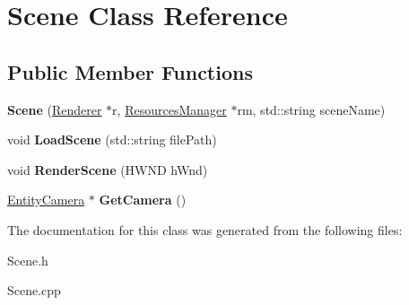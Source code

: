 \hypertarget{class_scene}{\section{Scene Class Reference}
\label{class_scene}
}
\subsection*{Public Member Functions}
\begin{DoxyCompactItemize}
\item 
\hypertarget{class_scene_a5697fbceb61496683804758312cca023}{{\bfseries Scene} (\hyperlink{class_renderer}{Renderer} $\ast$r, \hyperlink{class_resources_manager}{Resources\-Manager} $\ast$rm, std\-::string scene\-Name)}\label{class_scene_a5697fbceb61496683804758312cca023}

\item 
\hypertarget{class_scene_a575e7cc7d0333362979cdd0be76db889}{void {\bfseries Load\-Scene} (std\-::string file\-Path)}\label{class_scene_a575e7cc7d0333362979cdd0be76db889}

\item 
\hypertarget{class_scene_aa8ad077509db46397cdd25de2c9ec771}{void {\bfseries Render\-Scene} (H\-W\-N\-D h\-Wnd)}\label{class_scene_aa8ad077509db46397cdd25de2c9ec771}

\item 
\hypertarget{class_scene_ae906c883bc1ef85741c8843baee1c4aa}{\hyperlink{class_entity_camera}{Entity\-Camera} $\ast$ {\bfseries Get\-Camera} ()}\label{class_scene_ae906c883bc1ef85741c8843baee1c4aa}

\end{DoxyCompactItemize}


The documentation for this class was generated from the following files\-:\begin{DoxyCompactItemize}
\item 
Scene.\-h\item 
Scene.\-cpp\end{DoxyCompactItemize}
